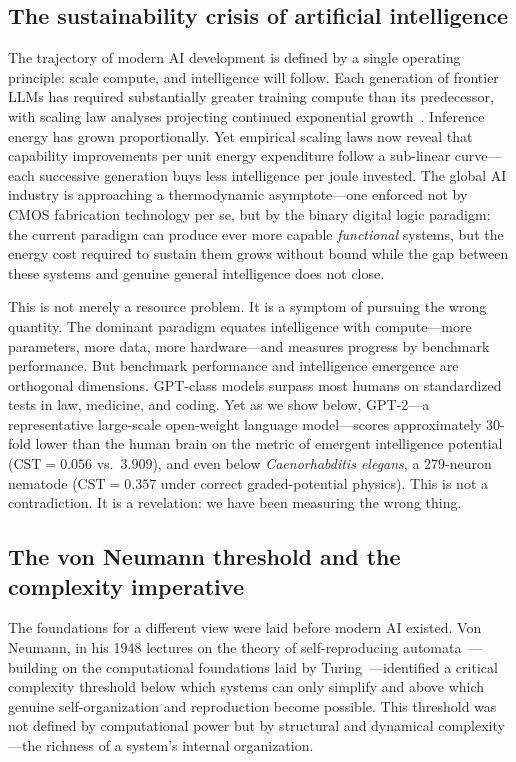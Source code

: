 \documentclass[12pt]{article}
\newcommand{\CST}{\mathrm{CST}}
\begin{document}
\subsection*{The sustainability crisis of artificial intelligence}

The trajectory of modern AI development is defined by a single operating principle: scale compute, and intelligence will follow. Each generation of frontier LLMs has required substantially greater training compute than its predecessor, with scaling law analyses projecting continued exponential growth~\cite{kaplan2020scaling}. Inference energy has grown proportionally. Yet empirical scaling laws now reveal that capability improvements per unit energy expenditure follow a sub-linear curve---each successive generation buys less intelligence per joule invested. The global AI industry is approaching a thermodynamic asymptote---one enforced not by CMOS fabrication technology per se, but by the binary digital logic paradigm: the current paradigm can produce ever more capable \emph{functional} systems, but the energy cost required to sustain them grows without bound while the gap between these systems and genuine general intelligence does not close.

This is not merely a resource problem. It is a symptom of pursuing the wrong quantity. The dominant paradigm equates intelligence with compute---more parameters, more data, more hardware---and measures progress by benchmark performance. But benchmark performance and intelligence emergence are orthogonal dimensions. GPT-class models surpass most humans on standardized tests in law, medicine, and coding. Yet as we show below, GPT-2---a representative large-scale open-weight language model---scores approximately 30-fold lower than the human brain on the metric of emergent intelligence potential ($\CST = 0.056$ vs.\ $3.909$), and even below \emph{Caenorhabditis elegans}, a 279-neuron nematode ($\CST = 0.357$ under correct graded-potential physics). This is not a contradiction. It is a revelation: we have been measuring the wrong thing.

\subsection*{The von Neumann threshold and the complexity imperative}

The foundations for a different view were laid before modern AI existed. Von Neumann, in his 1948 lectures on the theory of self-reproducing automata~\cite{vonneumann1966}---building on the computational foundations laid by Turing~\cite{turing1950}---identified a critical complexity threshold below which systems can only simplify and above which genuine self-organization and reproduction become possible. This threshold was not defined by computational power but by structural and dynamical complexity---the richness of a system's internal organization.
\end{document}
